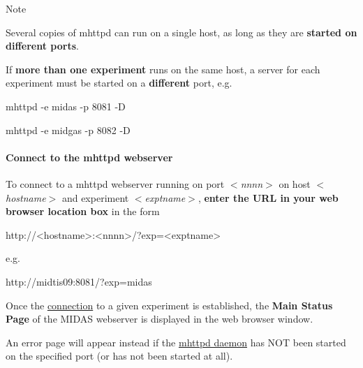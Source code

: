 \begin{DoxyNote}{Note}

\begin{DoxyItemize}
\item Several copies of mhttpd can run on a single host, as long as they are {\bfseries started on different ports}.
\item If {\bfseries more than one experiment} runs on the same host, a server for each experiment must be started on a {\bfseries different} port, e.g.
\begin{DoxyItemize}
\item mhttpd -\/e midas -\/p 8081 -\/D
\item mhttpd -\/e midgas -\/p 8082 -\/D
\end{DoxyItemize}
\end{DoxyItemize}
\end{DoxyNote}
\par


\par


\label{RC_mhttpd_utility_idx_mhttpd-utility_connect}
\hypertarget{RC_mhttpd_utility_idx_mhttpd-utility_connect}{}
 \hypertarget{RC_mhttpd_utility_RC_mhttpd_connect}{}\paragraph{Connect to the mhttpd webserver}\label{RC_mhttpd_utility_RC_mhttpd_connect}
To connect to a mhttpd webserver running on port {\itshape $<$nnnn$>$\/} on host {\itshape $<$hostname$>$\/} and experiment {\itshape $<$exptname$>$\/}, {\bfseries enter the URL in your web browser location box} in the form


\begin{DoxyCode}
 http://<hostname>:<nnnn>/?exp=<exptname>
\end{DoxyCode}
 e.g. 
\begin{DoxyCode}
 http://midtis09:8081/?exp=midas
\end{DoxyCode}
 \par


\label{RC_mhttpd_utility_RC_mhttpd_msp_default}
\hypertarget{RC_mhttpd_utility_RC_mhttpd_msp_default}{}


Once the \hyperlink{RC_mhttpd_utility_RC_mhttpd_connect}{connection} to a given experiment is established, the {\bfseries Main Status Page} of the MIDAS webserver is displayed in the web browser window. \par
 An error page will appear instead if the \hyperlink{RC_mhttpd_utility}{mhttpd daemon} has NOT been started on the specified port (or has not been started at all). \par


